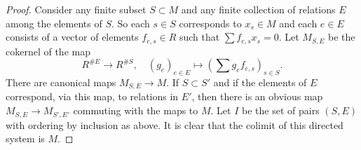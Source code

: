 \documentclass[10pt,a4paper]{amsart}
\theoremstyle{plain}
\theoremstyle{definition}
\theoremstyle{remark}
\numberwithin{equation}{subsection}
\begin{document}
\begin{proof}
Consider any finite subset $S \subset M$ and any finite
collection of relations $E$ among the elements
of $S$. So each $s \in S$ corresponds to $x_s \in M$ and
each $e \in E$ consists of a vector
of elements $f_{e, s} \in R$ such that $\sum f_{e, s} x_s = 0$.
Let $M_{S, E}$ be the cokernel of the map
$$
R^{\# E} \longrightarrow R^{\# S}, \quad
(g_e)_{e\in E} \longmapsto (\sum g_e f_{e, s})_{s\in S}.
$$
There are canonical maps $M_{S, E} \to M$.
If $S \subset S'$ and if the elements of
$E$ correspond, via this map, to relations
in $E'$, then there is an obvious map
$M_{S, E} \to M_{S', E'}$ commuting with the
maps to $M$. Let $I$ be the set of pairs
$(S, E)$ with ordering by inclusion as above.
It is clear that the colimit of this directed system is $M$.
\end{proof}
\end{document}
